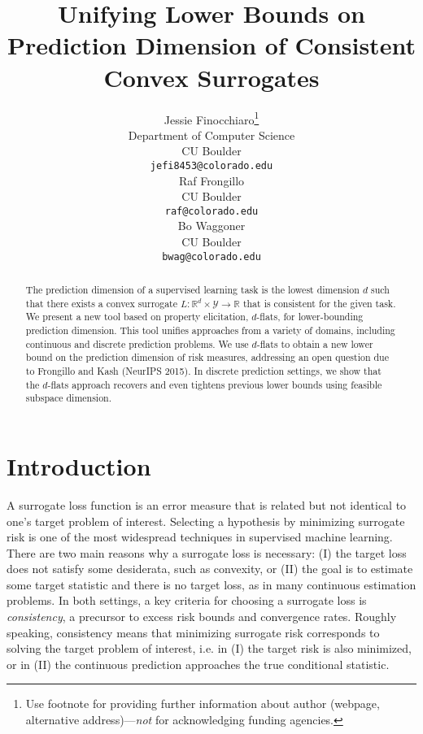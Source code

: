 \documentclass[11pt]{article} %
\title{Unifying Lower Bounds on Prediction Dimension of Consistent Convex Surrogates}
\author{%
	Jessie Finocchiaro\thanks{Use footnote for providing further information
		about author (webpage, alternative address)---\emph{not} for acknowledging
		funding agencies.} \\
	Department of Computer Science\\
	CU Boulder\\
	\texttt{jefi8453@colorado.edu} \\
	\And
	Raf Frongillo \\
	CU Boulder \\
	\texttt{raf@colorado.edu} \\
	\AND
	Bo Waggoner\\
	CU Boulder \\
	\texttt{bwag@colorado.edu} \\
}
\newcommand{\Comments}{1}
\newcommand{\mytodo}[2]{\ifnum\Comments=1%
	\todo[linecolor=#1!80!black,backgroundcolor=#1,bordercolor=#1!80!black]{#2}\fi}
\newcommand{\raft}[1]{\mytodo{green!20!white}{RF: #1}}
\begin{document}
\maketitle

\begin{abstract}
The prediction dimension of a supervised learning task is the lowest dimension $d$ such that there exists a convex surrogate $L : \mathbb{R}^d \times \mathcal{Y} \to \mathbb{R}$ that is consistent for the given task.
  We present a new tool based on property elicitation, $d$-flats, for lower-bounding prediction dimension.
  This tool unifies approaches from a variety of domains, including continuous and discrete prediction problems.
  We use $d$-flats to obtain a new lower bound on the prediction dimension of risk measures, addressing an open question due to Frongillo and Kash (NeurIPS 2015).
  In discrete prediction settings, we show that the $d$-flats approach recovers and even tightens previous lower bounds using feasible subspace dimension.
\end{abstract}

\section{Introduction}\label{sec:intro}
A surrogate loss function is an error measure that is related but not identical to one's target problem of interest.
Selecting a hypothesis by minimizing surrogate risk is one of the most widespread techniques in supervised machine learning.
There are two main reasons why a surrogate loss is necessary: (I) the target loss does not satisfy some desiderata, such as convexity, or (II) the goal is to estimate some target statistic and there is no target loss, as in many continuous estimation problems.
In both settings, a key criteria for choosing a surrogate loss is \emph{consistency}, a precursor to excess risk bounds and convergence rates.
Roughly speaking, consistency means that minimizing surrogate risk corresponds to solving the target problem of interest, i.e. in (I) the target risk is also minimized, or in (II) the continuous prediction approaches the true conditional statistic.
\end{document}
